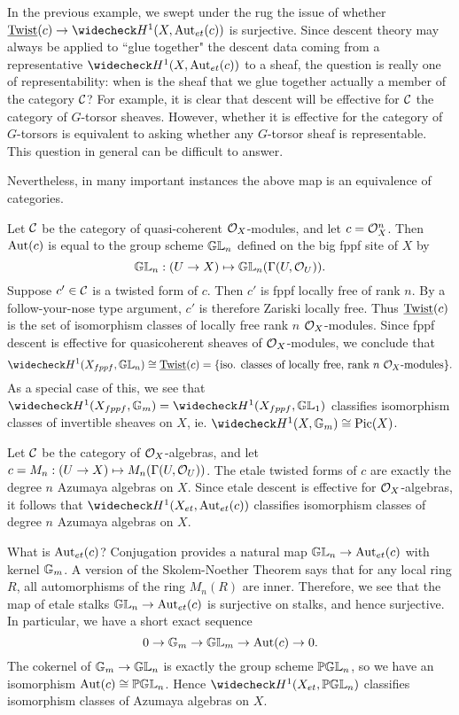 In the previous example, we swept under the rug the issue of whether $\twist(c)\rightarrow\wc{H}^1(X,\Aut_{et}(c))$ is surjective.  Since descent theory may always be applied to ``glue together" the descent data coming from a representative $\wc{H}^1(X,\Aut_{et}(c))$ to a sheaf, the question is really one of representability: when is the sheaf that we glue together actually a member of the category $\mathcal{C}$?  For example, it is clear that descent will be effective for $\mathcal{C}$ the category of $G$-torsor sheaves.  However, whether it is effective for the category of $G$-torsors is equivalent to asking whether any $G$-torsor sheaf is representable.  This question in general can be difficult to answer.

Nevertheless, in many important instances the above map is an equivalence of categories.
\begin{ex}
Let $\mathcal{C}$ be the category of quasi-coherent $\mathcal{O}_X$-modules, and let $c = \mathcal{O}_X^n$.  Then $\textnormal{Aut}(c)$ is equal to the group scheme $\mathbb{GL}_n$ defined on the big fppf site of $X$ by
$$\mathbb{GL}_n: (U\rightarrow X)\mapsto \mathbb{GL}_n(\Gamma(U,\mathcal{O}_U)).$$
Suppose $c'\in\mathcal{C}$ is a twisted form of $c$.  Then $c'$ is fppf locally free of rank $n$.  By a follow-your-nose type argument, $c'$ is therefore Zariski locally free.  Thus $\textnormal{\underline{Twist}}(c)$ is the set of isomorphism classes of locally free rank $n$ $\mathcal{O}_X$-modules.  Since fppf descent is  effective for quasicoherent sheaves of $\mathcal{O}_X$-modules, we conclude that
$$\wc{H}^1(X_{fppf},\bbgl_n)\cong \twist(c) = \{\text{iso. classes of locally free, rank $n$ $\sheaf O_X$-modules}\}.$$
As a special case of this, we see that $\wc{H}^1(X_{fppf},\bbg_m) = \wc H^1(X_{fppf},\bbgl_1)$ classifies isomorphism classes of invertible sheaves on $X$, ie. $\wc{H}^1(X,\bbg_m) \cong \Pic(X)$.
\end{ex}
\begin{ex}
Let $\mathcal{C}$ be the category of $\mathcal{O}_X$-algebras, and let $c = M_n: (U\rightarrow X)\mapsto M_n(\Gamma(U,\mathcal{O}_U))$.  The etale twisted forms of $c$ are exactly the degree $n$ Azumaya algebras on $X$.  Since etale descent is effective for $\mathcal{O}_X$-algebras, it follows that $\wc{H}^1(X_{et},\Aut_{et}(c))$ classifies isomorphism classes of degree $n$ Azumaya algebras on $X$.

What is $\textnormal{Aut}_{et}(c)$?  Conjugation provides a natural map $\mathbb{GL}_n\rightarrow \textnormal{Aut}_{et}(c)$ with kernel $\mathbb{G}_m$.  A version of the Skolem-Noether Theorem says that for any local ring $R$, all automorphisms of the ring $M_n(R)$ are inner.  Therefore, we see that the map of etale stalks $\mathbb{GL}_n\rightarrow\textnormal{Aut}_{et}(c)$ is surjective on stalks, and hence surjective.  In particular, we have a short exact sequence
$$0\rightarrow\mathbb{G}_m\rightarrow\mathbb{GL}_m\rightarrow\textnormal{Aut}(c)\rightarrow 0.$$
The cokernel of $\mathbb{G}_m\rightarrow \mathbb{GL}_n$ is exactly the group scheme $\mathbb{PGL}_n$, so we have an isomorphism $\textnormal{Aut}(c)\cong\mathbb{PGL}_n$.  Hence $\wc H^1(X_{et},\bbpgl_n)$ classifies isomorphism classes of Azumaya algebras on $X$.
\end{ex}

